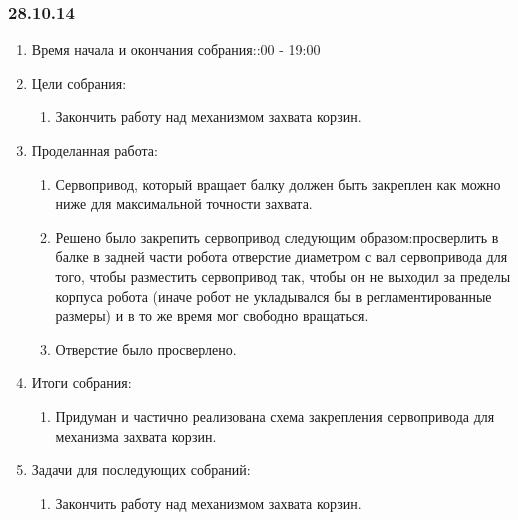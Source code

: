 
\subsubsection{28.10.14}

\begin{enumerate}
	\item Время начала и окончания собрания::00 - 19:00
	\item Цели собрания:\newline
	\begin{enumerate}
	  \item Закончить работу над механизмом захвата корзин.\newline
	  
    \end{enumerate}
    
	\item Проделанная работа:\newline
	\begin{enumerate}
	  \item Сервопривод, который вращает балку должен быть закреплен как можно ниже для максимальной точности захвата.\newline
      
      \item Решено было закрепить сервопривод следующим образом:просверлить в балке в задней части робота отверстие диаметром с вал сервопривода для того, чтобы разместить сервопривод так, чтобы он не выходил за пределы корпуса робота (иначе робот не укладывался бы в регламентированные размеры) и в то же время мог свободно вращаться.\newline
      
      \item Отверстие было просверлено.\newline
      
    \end{enumerate}
    
	\item Итоги собрания: \newline
	\begin{enumerate}
	  \item Придуман и частично реализована схема закрепления сервопривода для механизма захвата корзин.\newline
	  
    \end{enumerate}
    
	\item Задачи для последующих собраний:\newline
	\begin{enumerate}
	  \item Закончить работу над механизмом захвата корзин.\newline
	  
    \end{enumerate}     
\end{enumerate}

\fillpage
